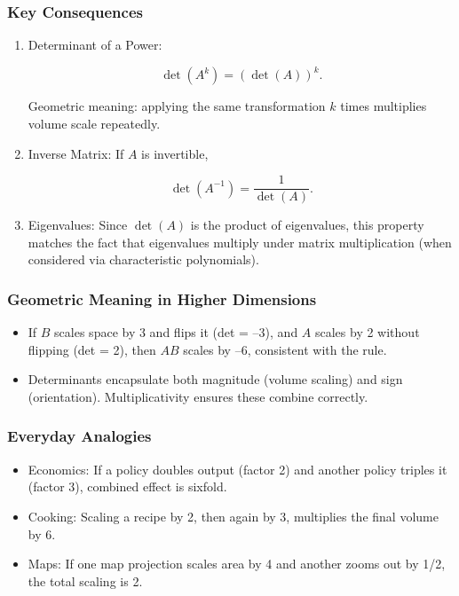 \documentclass[
  letterpaper,
  DIV=11,
  numbers=noendperiod]{scrreprt}
\providecommand{\tightlist}{%
  \setlength{\itemsep}{0pt}\setlength{\parskip}{0pt}}
\begin{document}
\subsubsection{Key Consequences}\label{key-consequences}

\begin{enumerate}
\def\labelenumi{\arabic{enumi}.}
\item
  Determinant of a Power:

  \[
  \det(A^k) = (\det(A))^k.
  \]

  Geometric meaning: applying the same transformation \(k\) times
  multiplies volume scale repeatedly.
\item
  Inverse Matrix: If \(A\) is invertible,

  \[
  \det(A^{-1}) = \frac{1}{\det(A)}.
  \]
\item
  Eigenvalues: Since \(\det(A)\) is the product of eigenvalues, this
  property matches the fact that eigenvalues multiply under matrix
  multiplication (when considered via characteristic polynomials).
\end{enumerate}

\subsubsection{Geometric Meaning in Higher
Dimensions}\label{geometric-meaning-in-higher-dimensions}

\begin{itemize}
\tightlist
\item
  If \(B\) scales space by 3 and flips it (det = --3), and \(A\) scales
  by 2 without flipping (det = 2), then \(AB\) scales by --6, consistent
  with the rule.
\item
  Determinants encapsulate both magnitude (volume scaling) and sign
  (orientation). Multiplicativity ensures these combine correctly.
\end{itemize}

\subsubsection{Everyday Analogies}\label{everyday-analogies-51}

\begin{itemize}
\tightlist
\item
  Economics: If a policy doubles output (factor 2) and another policy
  triples it (factor 3), combined effect is sixfold.
\item
  Cooking: Scaling a recipe by 2, then again by 3, multiplies the final
  volume by 6.
\item
  Maps: If one map projection scales area by 4 and another zooms out by
  1/2, the total scaling is 2.
\end{itemize}
\end{document}
